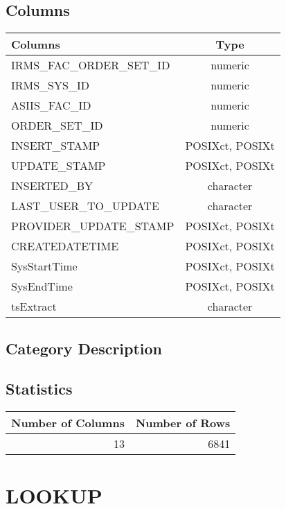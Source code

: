 \documentclass[
  letterpaper,
  DIV=11,
  numbers=noendperiod]{scrreprt}
\begin{document}
\hypertarget{columns-16}{%
\section*{Columns}\label{columns-16}}

\begin{longtable}{lc}
\toprule
Columns & Type \\ 
\midrule
IRMS\_FAC\_ORDER\_SET\_ID & numeric \\ 
IRMS\_SYS\_ID & numeric \\ 
ASIIS\_FAC\_ID & numeric \\ 
ORDER\_SET\_ID & numeric \\ 
INSERT\_STAMP & POSIXct, POSIXt \\ 
UPDATE\_STAMP & POSIXct, POSIXt \\ 
INSERTED\_BY & character \\ 
LAST\_USER\_TO\_UPDATE & character \\ 
PROVIDER\_UPDATE\_STAMP & POSIXct, POSIXt \\ 
CREATEDATETIME & POSIXct, POSIXt \\ 
SysStartTime & POSIXct, POSIXt \\ 
SysEndTime & POSIXct, POSIXt \\ 
tsExtract & character \\ 
\bottomrule
\end{longtable}

\hypertarget{category-description-16}{%
\section*{Category Description}\label{category-description-16}}

\hypertarget{statistics-16}{%
\section*{Statistics}\label{statistics-16}}

\begin{longtable}{rr}
\toprule
Number of Columns & Number of Rows \\ 
\midrule
13 & 6841 \\ 
\bottomrule
\end{longtable}

\hypertarget{lookup}{%
\chapter*{LOOKUP}\label{lookup}}
\end{document}
